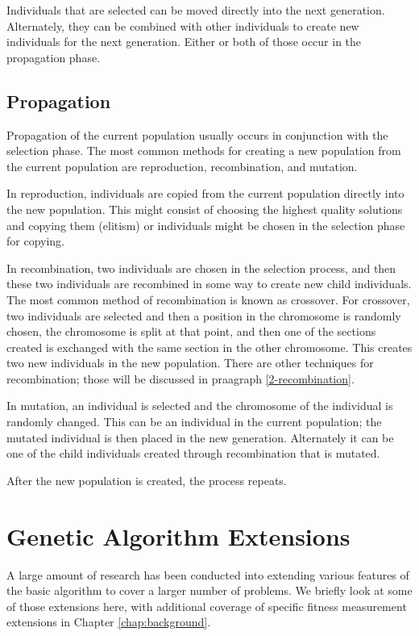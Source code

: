 Individuals that are selected can be moved directly into the next generation.
Alternately, they can be combined with other individuals to create new
individuals for the next generation. Either or both of those occur in the
propagation phase.

\subsection{Propagation}

Propagation of the current population usually occurs in conjunction with the
selection phase. The most common methods for creating a new population from the
current population are reproduction, recombination, and mutation.

In reproduction, individuals are copied from the current population directly
into the new population. This might consist of choosing the highest quality
solutions and copying them (elitism) or individuals might be chosen in the
selection phase for copying.

In recombination, two individuals are chosen in the selection process, and then
these two individuals are recombined in some way to create new child
individuals. The most common method of recombination is known as crossover. For
crossover, two individuals are selected and then a position in the chromosome is
randomly chosen, the chromosome is split at that point, and then one of the
sections created is exchanged with the same section in the other chromosome.
This creates two new individuals in the new population. There are other
techniques for recombination; those will be discussed in praagraph
\ref{2-recombination}.

In mutation, an individual is selected and the chromosome of the individual is
randomly changed. This can be an individual in the current population; the
mutated individual is then placed in the new generation. Alternately it can be
one of the child individuals created through recombination that is mutated.

After the new population is created, the process repeats.

\section{Genetic Algorithm Extensions}

A large amount of research has been conducted into extending various features of
the basic algorithm to cover a larger number of problems. We briefly look at
some of those extensions here, with additional coverage of specific fitness
measurement extensions in Chapter \ref{chap:background}.

